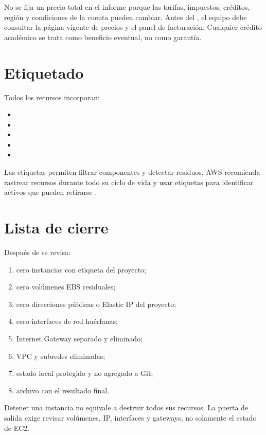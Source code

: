 No se fija un precio total en el informe porque las tarifas, impuestos, créditos, región y condiciones de la cuenta pueden cambiar. Antes del , el equipo debe consultar la página vigente de precios y el panel de facturación. Cualquier crédito académico se trata como beneficio eventual, no como garantía.

\section{Etiquetado}

Todos los recursos incorporan:

\begin{itemize}
  \item {}
  \item {}
  \item {}
  \item {}
  \item {}
\end{itemize}

Las etiquetas permiten filtrar componentes y detectar residuos. AWS recomienda rastrear recursos durante todo su ciclo de vida y usar etiquetas para identificar activos que pueden retirarse \cite{aws-track-resources}.

\section{Lista de cierre}

Después de  se revisa:

\begin{enumerate}
  \item cero instancias con etiqueta del proyecto;
  \item cero volúmenes EBS residuales;
  \item cero direcciones públicas o Elastic IP del proyecto;
  \item cero interfaces de red huérfanas;
  \item Internet Gateway separado y eliminado;
  \item VPC y subredes eliminadas;
  \item estado local protegido y no agregado a Git;
  \item archivo  con el resultado final.
\end{enumerate}

\begin{warningbox}
Detener una instancia no equivale a destruir todos sus recursos. La puerta de salida exige revisar volúmenes, IP, interfaces y gateways, no solamente el estado de EC2.
\end{warningbox}
